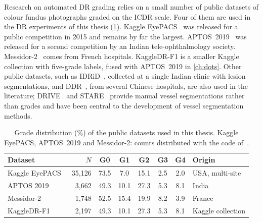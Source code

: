 Research on automated DR grading relies on a small number of public datasets of colour
fundus photographs graded on the ICDR scale. Four of them are used in the DR experiments
of this thesis (\cref{tab:datasets}). Kaggle EyePACS~\cite{kaggle2015eyepacs} was released
for a public competition in 2015 and remains by far the largest. APTOS~2019~\cite{aptos2019}
was released for a second competition by an Indian tele-ophthalmology society.
Messidor-2~\cite{decenciere2014messidor} comes from French hospitals. KaggleDR-F1 is a
smaller Kaggle collection with five-grade labels, fused with APTOS~2019 in
\cref{ch:dots}. Other public datasets, such as IDRiD~\cite{porwal2018idrid,porwal2020idrid},
collected at a single Indian clinic with lesion segmentations, and DDR~\cite{li2019ddr},
from several Chinese hospitals, are also used in the literature; DRIVE~\cite{staal2004drive}
and STARE~\cite{hoover2000stare} provide manual vessel segmentations rather than grades and
have been central to the development of vessel segmentation methods.

\begin{table}[!htbp]
\centering
\caption[Grade distribution (\%) of the public datasets used in this thesis]{Grade distribution (\%) of the public datasets used in this thesis. Kaggle
EyePACS, APTOS~2019 and Messidor-2: counts distributed with the code of~\cite{belhadj2025plos}.}
\label{tab:datasets}
\small
\begin{tabular}{@{}lrccccc l@{}}
\toprule
Dataset & $N$ & G0 & G1 & G2 & G3 & G4 & Origin \\
\midrule
Kaggle EyePACS~\cite{kaggle2015eyepacs} & 35{,}126 & 73.5 & 7.0 & 15.1 & 2.5 & 2.0 & USA, multi-site \\
APTOS 2019~\cite{aptos2019} & 3{,}662 & 49.3 & 10.1 & 27.3 & 5.3 & 8.1 & India \\
Messidor-2~\cite{decenciere2014messidor} & 1{,}748 & 52.5 & 15.4 & 19.9 & 8.2 & 3.9 & France \\
KaggleDR-F1 & 2{,}197 & 49.3 & 10.1 & 27.3 & 5.3 & 8.1 & Kaggle collection \\
\bottomrule
\end{tabular}
\end{table}

